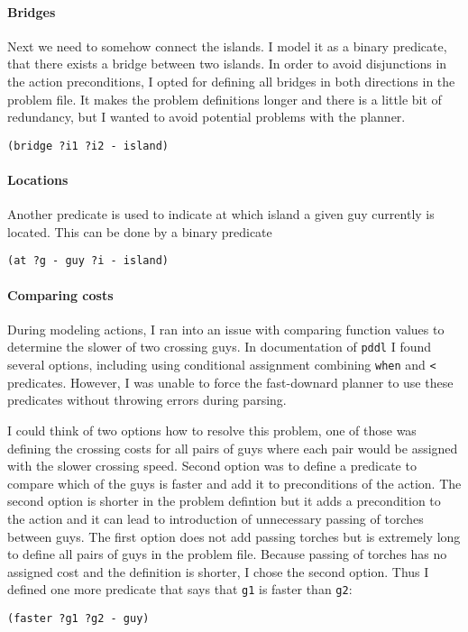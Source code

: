 \documentclass[a4paper,11pt]{article}
\begin{document}
\paragraph*{Bridges}
Next we need to somehow connect the islands.
I model it as a binary predicate, that there exists a bridge between two islands.
In order to avoid disjunctions in the action preconditions, I opted for defining all bridges in both directions in the problem file.
It makes the problem definitions longer and there is a little bit of redundancy, but I wanted to avoid potential problems with the planner.
\begin{verbatim}
(bridge ?i1 ?i2 - island)
\end{verbatim}

\paragraph*{Locations}
Another predicate is used to indicate at which island a given guy currently is located.
This can be done by a binary predicate
\begin{verbatim}
(at ?g - guy ?i - island)
\end{verbatim}

\paragraph*{Comparing costs}
During modeling actions, I ran into an issue with comparing function values to determine the slower of two crossing guys.
In documentation of \texttt{pddl} I found several options, including using conditional assignment combining \texttt{when} and \texttt{<} predicates.
However, I was unable to force the fast-downard planner to use these predicates without throwing errors during parsing.

I could think of two options how to resolve this problem, one of those was defining the crossing costs for all pairs of guys where each pair would be assigned with the slower crossing speed.
Second option was to define a predicate to compare which of the guys is faster and add it to preconditions of the action.
The second option is shorter in the problem defintion but it adds a precondition to the action and it can lead to introduction of unnecessary passing of torches between guys.
The first option does not add passing torches but is extremely long to define all pairs of guys in the problem file.
Because passing of torches has no assigned cost and the definition is shorter, I chose the second option.
Thus I defined one more predicate that says that \texttt{g1} is faster than \texttt{g2}:
\begin{verbatim}
(faster ?g1 ?g2 - guy)
\end{verbatim}
\end{document}
